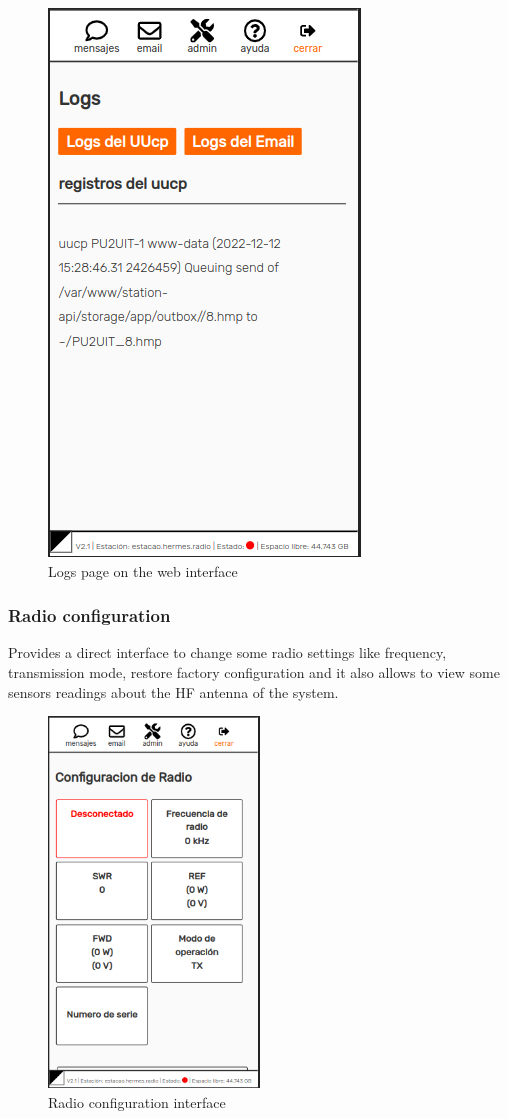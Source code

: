 \documentclass[11pt,a4paper]{article}
\begin{document}
    \begin{figure}[H]
    \centering
    \includegraphics[width=0.5\columnwidth]{screenshots/frontend/es/logs.png}
    \caption{Logs page on the web interface}
    \label{fig:logs}
\end{figure}

\subsubsection{Radio configuration}

Provides a direct interface to  change some radio settings like frequency, transmission mode, restore factory configuration and it also allows to view some sensors readings about the HF antenna of the system. 

\begin{figure}[H]
    \centering
    \includegraphics[width=0.5\textwidth]{screenshots/frontend/es/radioconfig.png}
    \caption{Radio configuration interface}
	\vspace{-10pt}
    \label{fig:radioconf}
\end{figure}
\end{document}
